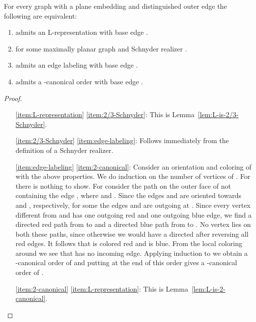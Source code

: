 \documentclass{llncs}
\begin{document}
\begin{theorem}\label{thm:characterization}
 For every graph  with a plane embedding and distinguished outer edge  the following are equivalent:
 \begin{enumerate}[label = (C\arabic*)]
  \item  admits an L-representation with base edge .\label{item:L-representation}
  \item  for some maximally planar graph  and Schnyder realizer .\label{item:2/3-Schnyder}
\item  admits an edge labeling with base edge .\label{item:edge-labeling}
  \item  admits a -canonical order with base edge .\label{item:2-canonical}
 \end{enumerate}
\end{theorem}
\begin{proof}
\begin{itemize}[itemindent = 45pt]
  \item[\ref{item:L-representation}  \ref{item:2/3-Schnyder}:] This is Lemma~\ref{lem:L-is-2/3-Schnyder}.
  
  \item[\ref{item:2/3-Schnyder}  \ref{item:edge-labeling}:] Follows immediately from the definition of a Schnyder realizer.
  
  \item[\ref{item:edge-labeling}  \ref{item:2-canonical}:] Consider an orientation and coloring of  with the above properties. We do induction on the number of vertices of . For  there is nothing to show. For  consider the path  on the outer face of  not containing the edge , where  and . Since the edges  and  are oriented towards  and , respectively, for some  the edges  and  are outgoing at . Since every vertex different from  and  has one outgoing red and one outgoing blue edge, we find a directed red path from  to  and a directed blue path from  to . No vertex  lies on both these paths, since otherwise we would have a directed after reversing all red edges. It follows that  is colored red and  is blue. From the local 
coloring around  we see that  has no incoming edge. Applying induction to  we obtain a -canonical order of  and putting  at the end of this order gives a -canonical order of .
  
  \item[\ref{item:2-canonical}  \ref{item:L-representation}:] This is Lemma~\ref{lem:L-is-2-canonical}.
 \end{itemize}
\end{proof}
\end{document}
